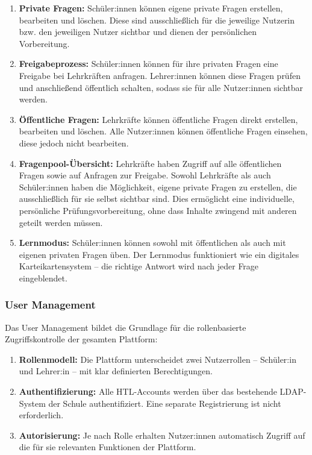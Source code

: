 \begin{enumerate}
    \item \textbf{Private Fragen:} Schüler:innen können eigene private Fragen
    erstellen, bearbeiten und löschen. Diese sind ausschließlich für die
    jeweilige Nutzerin bzw. den jeweiligen Nutzer sichtbar und dienen der
    persönlichen Vorbereitung.

    \item \textbf{Freigabeprozess:} Schüler:innen können für ihre privaten
    Fragen eine Freigabe bei Lehrkräften anfragen. Lehrer:innen können diese Fragen
    prüfen und anschließend öffentlich schalten, sodass sie für alle
    Nutzer:innen sichtbar werden.

    \item \textbf{Öffentliche Fragen:} Lehrkräfte können öffentliche Fragen
    direkt erstellen, bearbeiten und löschen. Alle Nutzer:innen können
    öffentliche Fragen einsehen, diese jedoch nicht bearbeiten.

    \item \textbf{Fragenpool-Übersicht:} Lehrkräfte haben Zugriff auf alle
    öffentlichen Fragen sowie auf Anfragen zur Freigabe. Sowohl Lehrkräfte als auch Schüler:innen haben die Möglichkeit, eigene private Fragen zu erstellen, die ausschließlich für sie selbst sichtbar sind. Dies ermöglicht eine individuelle, persönliche Prüfungsvorbereitung, ohne dass Inhalte zwingend mit anderen geteilt werden müssen.

    \item \textbf{Lernmodus:} Schüler:innen können sowohl mit öffentlichen
    als auch mit eigenen privaten Fragen üben. Der Lernmodus funktioniert
    wie ein digitales Karteikartensystem -- die richtige Antwort wird nach
    jeder Frage eingeblendet.
\end{enumerate}

\subsubsection{User Management}

Das User Management bildet die Grundlage für die rollenbasierte
Zugriffskontrolle der gesamten Plattform:

\begin{enumerate}
    \item \textbf{Rollenmodell:} Die Plattform unterscheidet zwei
    Nutzerrollen -- Schüler:in und Lehrer:in -- mit klar
    definierten Berechtigungen.

    \item \textbf{Authentifizierung:} Alle HTL-Accounts werden über das
    bestehende LDAP-System der Schule authentifiziert. Eine separate
    Registrierung ist nicht erforderlich.

    \item \textbf{Autorisierung:} Je nach Rolle erhalten Nutzer:innen
    automatisch Zugriff auf die für sie relevanten Funktionen der Plattform.
\end{enumerate}
